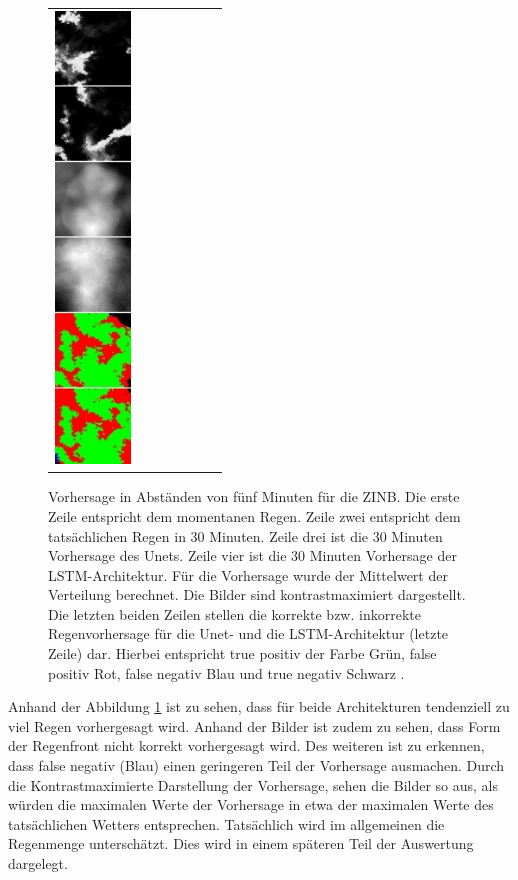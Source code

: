 \begin{figure}[h]
\begin{tabular}{lllllll}
\includegraphics[width=20mm]{abb/prediction/106_maxCont}
\end{tabular}
\caption{Vorhersage in Abständen von fünf Minuten für die ZINB. Die erste Zeile entspricht dem momentanen Regen. Zeile zwei entspricht dem tatsächlichen Regen in 30 Minuten. Zeile drei ist die 30 Minuten Vorhersage des Unets. Zeile vier ist die 30 Minuten Vorhersage der LSTM-Architektur. Für die Vorhersage wurde der Mittelwert der Verteilung berechnet. Die Bilder sind kontrastmaximiert dargestellt. Die letzten beiden Zeilen stellen die korrekte bzw. inkorrekte Regenvorhersage für die Unet- und die LSTM-Architektur (letzte Zeile) dar.
Hierbei entspricht true positiv der Farbe Grün, false positiv Rot, false negativ Blau und true negativ Schwarz .\label{fig:predNegBin}}
\end{figure}

\noindent Anhand der Abbildung \ref{fig:predNegBin} ist zu sehen, dass für beide Architekturen tendenziell zu viel Regen vorhergesagt wird. Anhand der Bilder ist zudem zu sehen, dass Form der Regenfront nicht korrekt vorhergesagt wird. Des weiteren ist zu erkennen, dass false negativ (Blau) einen geringeren Teil der Vorhersage ausmachen. Durch die Kontrastmaximierte Darstellung der Vorhersage, sehen die Bilder so aus, als würden die maximalen Werte der Vorhersage in etwa der maximalen Werte des tatsächlichen Wetters entsprechen. Tatsächlich wird im allgemeinen die Regenmenge unterschätzt. Dies wird in einem späteren Teil der Auswertung dargelegt.\\




